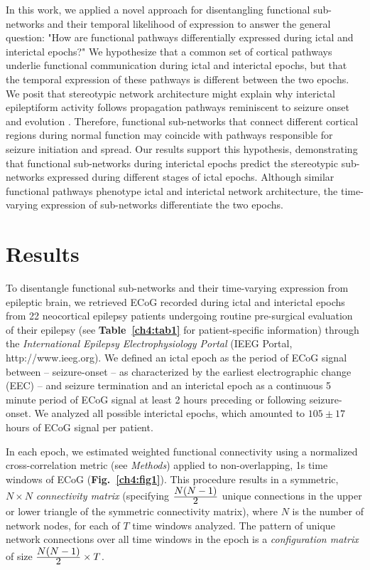In this work, we applied a novel approach for disentangling functional sub-networks and their temporal likelihood of expression to answer the general question: "How are functional pathways differentially expressed during ictal and interictal epochs?" We hypothesize that a common set of cortical pathways underlie functional communication during ictal and interictal epochs, but that the temporal expression of these pathways is different between the two epochs. We posit that stereotypic network architecture might explain why interictal epileptiform activity follows propagation pathways reminiscent to seizure onset and evolution \cite{alarcon1997origin, lai2007cortical, schevon2009spatial, wu2010removing, wilke2009identification,korzeniewska2014ictal}. Therefore, functional sub-networks that connect different cortical regions during normal function may coincide with pathways responsible for seizure initiation and spread. Our results support this hypothesis, demonstrating that functional sub-networks during interictal epochs predict the stereotypic sub-networks expressed during different stages of ictal epochs. Although similar functional pathways phenotype ictal and interictal network architecture, the time-varying expression of sub-networks differentiate the two epochs.

\section{Results}
To disentangle functional sub-networks and their time-varying expression from epileptic brain, we retrieved ECoG recorded during ictal and interictal epochs from 22 neocortical epilepsy patients undergoing routine pre-surgical evaluation of their epilepsy (see \textbf{Table~{\ref{ch4:tab1}}} for patient-specific information) through the \textit{International Epilepsy Electrophysiology Portal} (IEEG Portal, http://www.ieeg.org). We defined an ictal epoch as the period of ECoG signal between -- seizure-onset -- as characterized by the earliest electrographic change (EEC) \cite{litt2001epileptic} -- and seizure termination and an interictal epoch as a continuous 5 minute period of ECoG signal at least 2 hours preceding or following seizure-onset. We analyzed all possible interictal epochs, which amounted to $105\pm17$ hours of ECoG signal per patient.

In each epoch, we estimated weighted functional connectivity using a normalized cross-correlation metric (see \textit{Methods}) applied to non-overlapping, 1s time windows of ECoG (\textbf{Fig.~\ref{ch4:fig1}}). This procedure results in a symmetric, $N \times N$ \textit{connectivity matrix} (specifying $\frac{\displaystyle N(N-1)}{\displaystyle 2}$ unique connections in the upper or lower triangle of the symmetric connectivity matrix), where $N$ is the number of network nodes, for each of $T$ time windows analyzed. The pattern of unique network connections over all time windows in the epoch is a \textit{configuration matrix} of size $\frac{\displaystyle N(N-1)}{\displaystyle 2} \times T$.

